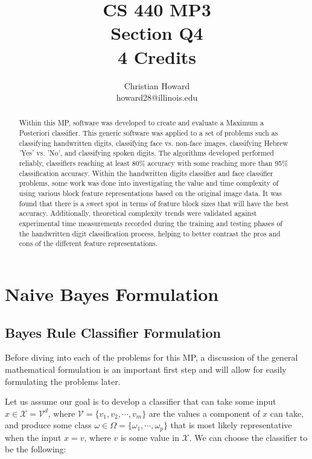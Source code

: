 \documentclass{article}[12pt]
\title{CS 440 MP3 \\ Section Q4 \\ 4 Credits}
\author{
Christian Howard \\ howard28@illinois.edu
}
\date{} %
\begin{document}
   
   \maketitle
   \begin{abstract}
   Within this MP, software was developed to create and evaluate a Maximum a Posteriori classifier. This generic software was applied to a set of problems such as classifying handwritten digits, classifying face vs. non-face images, classifying Hebrew 'Yes' vs. 'No', and classifying spoken digits. The algorithms developed performed reliably, classifiers reaching at least 80\% accuracy with some reaching more than 95\% classification accuracy. Within the handwritten digits classifier and face classifier problems, some work was done into investigating the value and time complexity of using various block feature representations based on the original image data. It was found that there is a sweet spot in terms of feature block sizes that will have the best accuracy. Additionally, theoretical complexity trends were validated against experimental time measurements recorded during the training and testing phases of the handwritten digit classification process, helping to better contrast the pros and cons of the different feature representations.
   \end{abstract}
   \newpage
   
   \tableofcontents
   \newpage
   
   \section{Naive Bayes Formulation} \label{sec:one}
   
   \subsection{Bayes Rule Classifier Formulation}
   Before diving into each of the problems for this MP, a discussion of the general mathematical formulation is an important first step and will allow for easily formulating the problems later.
   
   Let us assume our goal is to develop a classifier that can take some input $x \in \mathcal{X} = \mathcal{V}^d$, where $\mathcal{V} = \lbrace v_1, v_2, \cdots, v_m\rbrace$ are the values a component of $x$ can take, and produce some class $\omega \in \Omega = \lbrace \omega_1, \cdots, \omega_p \rbrace$ that is most likely representative when the input $x = v$, where $v$ is some value in $\mathcal{X}$. We can choose the classifier to be the following:
   
\end{document}

